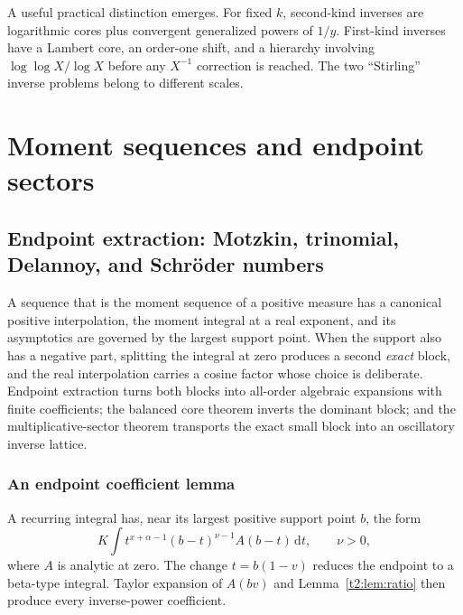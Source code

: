 \documentclass[11pt,openany]{book}
\numberwithin{equation}{chapter}
\theoremstyle{plain}
\theoremstyle{definition}
\theoremstyle{remark}
\newcommand{\dd}{\,\mathrm d}                 %
\begin{document}
A useful practical distinction emerges. For fixed $k$, second-kind inverses are logarithmic cores plus convergent generalized powers of $1/y$. First-kind inverses have a Lambert core, an order-one shift, and a hierarchy involving $\log\log X/\log X$ before any $X^{-1}$ correction is reached. The two ``Stirling'' inverse problems belong to different scales.

\part{Moment sequences and endpoint sectors}
\label{ct:part:moments}

\chapter{Endpoint extraction: Motzkin, trinomial, Delannoy, and Schr\"oder numbers}
\label{ct:ch:moments}

A sequence that is the moment sequence of a positive measure has a canonical
positive interpolation, the moment integral at a real exponent, and its
asymptotics are governed by the largest support point.  When the support
also has a negative part, splitting the integral at zero produces a second
\emph{exact} block, and the real interpolation carries a cosine factor whose
choice is deliberate.  Endpoint extraction turns both blocks into all-order
algebraic expansions with finite coefficients; the balanced core theorem
inverts the dominant block; and the multiplicative-sector theorem transports
the exact small block into an oscillatory inverse lattice.

\section{An endpoint coefficient lemma}

A recurring integral has, near its largest positive support point $b$, the form
\[
 K\int t^{x+\alpha-1}(b-t)^{\nu-1}A(b-t)\dd t,
 \qquad \nu>0,
\]
where $A$ is analytic at zero. The change $t=b(1-v)$ reduces the endpoint to a beta-type integral. Taylor expansion of $A(bv)$ and Lemma~\ref{t2:lem:ratio} then produce every inverse-power coefficient.
\end{document}
